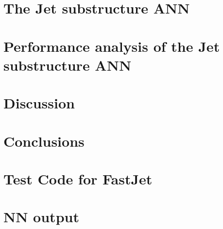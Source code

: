 \documentclass[12pt,a4paper,twoside]{report}
\begin{document}
\chapter{The Jet substructure ANN}\label{ch:jsann}


\chapter{Performance analysis of the Jet substructure ANN}\label{ch:analysisjsann}


\chapter{Discussion}



\chapter{Conclusions}


\appendix 
\chapter{Test Code for FastJet}\label{ch:test_code_code}


\chapter{NN output}\label{ch:nnoutput}


%

\begin{comment}
\end{comment}

\printbibliography
\end{document}
